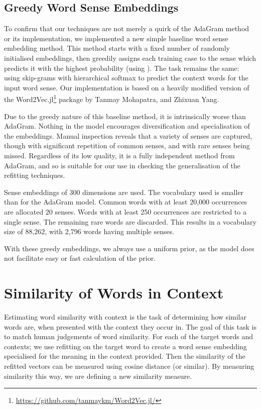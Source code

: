 \documentclass{llncs}
\begin{document}
\subsection{Greedy Word Sense Embeddings}

To confirm that our techniques are not merely a quirk of the AdaGram method or its implementation, we implemented a new simple baseline word sense embedding method.
This method starts with a fixed number of randomly initialised embeddings, then greedily assigns each training case to the sense which predicts it with the highest probability (using ).
The task remains the same: using skip-grams with hierarchical softmax to predict the context words for the input word sense.
Our implementation is based on a heavily modified version of the Word2Vec.jl\footnote{\url{https://github.com/tanmaykm/Word2Vec.jl/}} package by Tanmay Mohapatra, and Zhixuan Yang.

Due to the greedy nature of this baseline method, it is intrinsically worse than AdaGram.
Nothing in the model encourages diversification and specialisation of the embeddings.
Manual inspection reveals that a variety of senses are captured, though with significant repetition of common senses, and with rare senses being missed.
Regardless of its low quality, it is a fully independent method from AdaGram, and so is suitable for our use in checking the generalisation of the refitting techniques.

Sense embeddings of 300 dimensions are used.
The vocabulary used is smaller than for the AdaGram model.
Common words with at least 20,000 occurrences are allocated 20 senses.
Words with at least 250 occurrences are restricted to a single sense.
The remaining rare words are discarded. 
This results in a vocabulary size of 88,262, with 2,796 words having multiple senses.


With these greedy embeddings, we always use a uniform prior, as the model does not facilitate easy or fast calculation of the prior.



\section{Similarity of Words in Context} \label{SimilarityInContext}
Estimating word similarity with context is the task of determining how similar words are, when presented with the context they occur in.
The goal of this task is to match human judgements of word similarity.
For each of the target words and contexts; we use refitting on the target word to create a word sense embedding specialised for the meaning in the context provided.
Then the similarity of the refitted vectors can be measured using cosine distance (or similar).
By measuring similarity this way, we are defining a new similarity measure.
\end{document}
